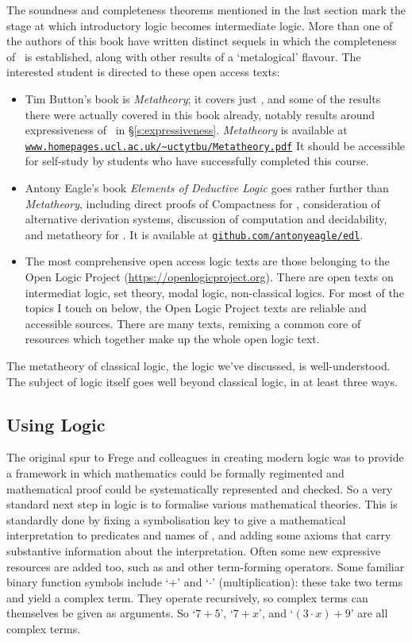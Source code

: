 The soundness and completeness theorems mentioned in the last section mark the stage at which introductory logic becomes intermediate logic. More than one of the authors of this book have written distinct sequels in which the completeness of \TFL\ is established, along with other results of a `metalogical' flavour. The interested student is directed to these open access texts: \begin{itemize}
	\item Tim Button's book is \emph{Metatheory}; it covers just \TFL, and some of the results there were actually covered in this book already, notably results around expressiveness of \TFL\ in §\ref{s:expressiveness}. \emph{Metatheory} is available at \href{http://www.homepages.ucl.ac.uk/~uctytbu/Metatheory.pdf}{\nolinkurl{www.homepages.ucl.ac.uk/~uctytbu/Metatheory.pdf}} It should be accessible for self-study by students who have successfully completed this course.

\item Antony Eagle's book \emph{Elements of Deductive Logic} goes rather further than \emph{Metatheory}, including direct proofs of Compactness for \TFL, consideration of alternative derivation systems, discussion of computation and decidability, and metatheory for \FOL. It is available at \href{https://github.com/antonyeagle/edl}{\nolinkurl{github.com/antonyeagle/edl}}.
\item The most comprehensive open access logic texts are those belonging to the Open Logic Project (\url{https://openlogicproject.org}). There are open texts on intermediat logic, set theory, modal logic, non-classical logics. For most of the topics I touch on below, the Open Logic Project texts are reliable and accessible sources. There are many texts, remixing a common core of resources which together make up the whole open logic text. 
\end{itemize}

The metatheory of classical logic, the logic we've discussed, is well-understood. The subject of logic itself goes well beyond classical logic, in at least three ways.

\subsection{Using Logic} The original spur to Frege and colleagues in creating modern logic was to provide a framework in which mathematics could be formally regimented and mathematical proof could be systematically represented and checked. So a very standard next step in logic is to formalise various mathematical theories. This is standardly done by fixing a symbolisation key to give a mathematical interpretation to predicates and names of \FOL, and adding some axioms that carry substantive information about the interpretation. Often some new expressive resources are added too, such as  and other term-forming operators. Some familiar binary function symbols include `$+$' and `$\cdot$' (multiplication): these take two terms and yield a complex term. They operate recursively, so complex terms can themselves be given as arguments. So `$7+5$', `$7+x$', and `$(3\cdot x) + 9$' are all complex terms. 

